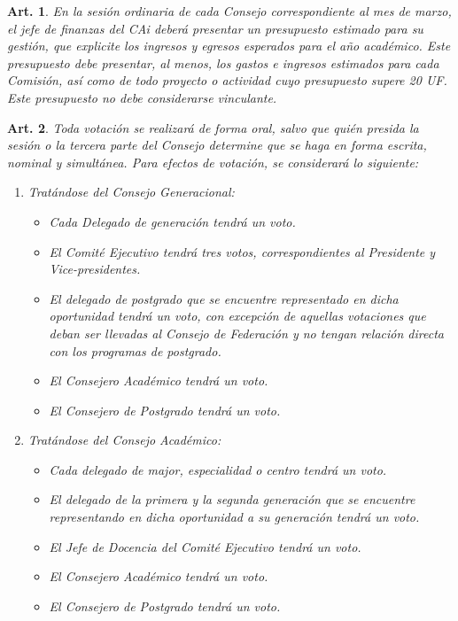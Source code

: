 \documentclass[letterpaper,11pt]{article}
\theoremstyle{plain}
\newtheorem{art}{Art.} %
\begin{document}
			\begin{art}\label{presupuestoEjecutivo}
				En la sesión ordinaria de cada Consejo correspondiente al mes de marzo, el jefe de finanzas del CAi deberá presentar un presupuesto estimado para su gestión, que explicite los ingresos y egresos esperados para el año académico. Este presupuesto debe presentar, al menos, los gastos e ingresos estimados para cada Comisión, así como de todo proyecto o actividad cuyo presupuesto supere 20 UF. Este presupuesto no debe considerarse vinculante.
			\end{art}

			\begin{art}\label{votacioncesConsejo}
				Toda votación se realizará de forma oral, salvo que quién presida la sesión o la tercera parte del Consejo determine que se haga en forma escrita, nominal y simultánea. Para efectos de votación, se considerará lo siguiente:
				\begin{enumerate}
					\item Tratándose del Consejo Generacional:
						\begin{itemize}
							\item Cada Delegado de generación tendrá un voto.
							\item El Comité Ejecutivo tendrá tres votos, correspondientes al Presidente y Vice-presidentes.
							\item El delegado de postgrado que se encuentre representado en dicha
							oportunidad tendrá un voto, con excepción de aquellas votaciones que deban ser llevadas al Consejo de Federación y no tengan relación directa con los programas de postgrado.
							\item El Consejero Académico tendrá un voto.
							\item El Consejero de Postgrado tendrá un voto.
						\end{itemize}
					\item Tratándose del Consejo Académico:
						\begin{itemize}
							\item Cada delegado de major, especialidad o centro tendrá un voto.
							\item El delegado de la primera y la segunda generación que se encuentre representando en dicha oportunidad a su generación tendrá un voto.
							\item El Jefe de Docencia del Comité Ejecutivo tendrá un voto.
							\item El Consejero Académico tendrá un voto.
							\item El Consejero de Postgrado tendrá un voto.

\end{itemize}
\end{enumerate}
\end{art}
\end{document}
